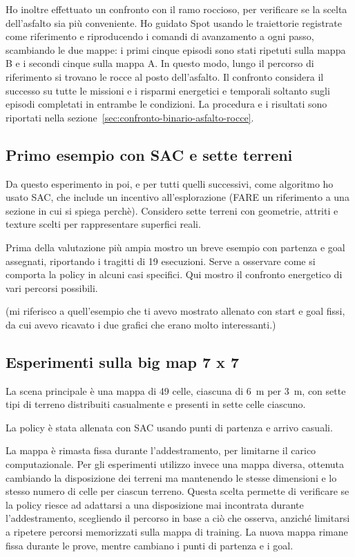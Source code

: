 \documentclass[11pt,a4paper]{article}
\begin{document}
Ho inoltre effettuato un confronto con il ramo roccioso, per verificare se la scelta dell'asfalto sia più conveniente. Ho guidato Spot usando le traiettorie registrate come riferimento e riproducendo i comandi di avanzamento a ogni passo, scambiando le due mappe: i primi cinque episodi sono stati ripetuti sulla mappa B e i secondi cinque sulla mappa A. In questo modo, lungo il percorso di riferimento si trovano le rocce al posto dell'asfalto. Il confronto considera il successo su tutte le missioni e i risparmi energetici e temporali soltanto sugli episodi completati in entrambe le condizioni. La procedura e i risultati sono riportati nella sezione~\ref{sec:confronto-binario-asfalto-rocce}.

\subsection{Primo esempio con SAC e sette terreni}

Da questo esperimento in poi, e per tutti quelli successivi, come algoritmo ho usato SAC, che include un incentivo all'esplorazione (FARE un riferimento a una sezione in cui si spiega perchè).
Considero sette terreni con geometrie, attriti e texture scelti per rappresentare superfici reali.

Prima della valutazione più ampia mostro un breve esempio con partenza e goal assegnati, riportando i tragitti di 19 esecuzioni.
Serve a osservare come si comporta la policy in alcuni casi specifici.
Qui mostro il confronto energetico di vari percorsi possibili.

(mi riferisco a quell'esempio che ti avevo mostrato allenato con start e goal fissi, da cui avevo ricavato i due grafici che erano molto interessanti.)


\subsection{Esperimenti sulla big map 7 x 7}

La scena principale è una mappa di 49 celle, ciascuna di 6~m per 3~m, con sette tipi di terreno distribuiti casualmente e presenti in sette celle ciascuno.

La policy è stata allenata con SAC usando punti di partenza e arrivo casuali.

La mappa è rimasta fissa durante l'addestramento, per limitarne il carico computazionale. Per gli esperimenti utilizzo invece una mappa diversa, ottenuta cambiando la disposizione dei terreni ma mantenendo le stesse dimensioni e lo stesso numero di celle per ciascun terreno. Questa scelta permette di verificare se la policy riesce ad adattarsi a una disposizione mai incontrata durante l'addestramento, scegliendo il percorso in base a ciò che osserva, anziché limitarsi a ripetere percorsi memorizzati sulla mappa di training. La nuova mappa rimane fissa durante le prove, mentre cambiano i punti di partenza e i goal.
\end{document}
